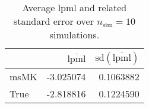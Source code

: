 \begin{table}[H]

\caption{Average lpml and related standard error over $n_{\text{sim}} = 10$ simulations.}
\centering
\begin{tabular}[t]{lrr}
\toprule
  & $\overbar{\text{lpml}}$ & $\text{sd}(\overbar{\text{lpml}})$\\
\midrule
msMK & -3.025074 & 0.1063882\\
True & -2.818816 & 0.1224590\\
\bottomrule
\end{tabular}
\end{table}